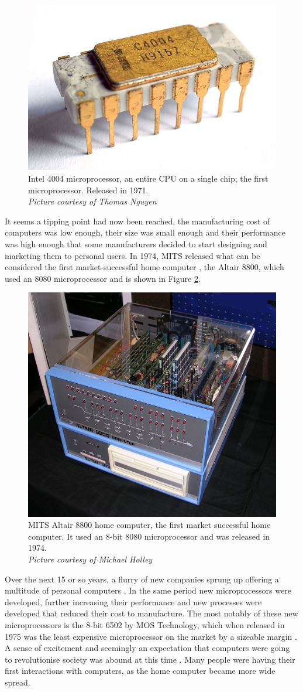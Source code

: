 \begin{figure} \begin{center}
\includegraphics[width=.3\linewidth]{pics/intel_4004} 
\end{center} 
\caption{Intel 4004 microprocessor, an entire CPU on a single chip; the first microprocessor. Released in 1971.\\ \textit{\small{Picture courtesy of Thomas Nguyen}}}
\label{Intel4004}
\end{figure} 

It seems a tipping point had now been reached, the manufacturing cost of computers was low enough, their size was small enough and their performance was high enough that some manufacturers decided to start designing and marketing them to personal users. In 1974, MITS released what can be considered the first market-successful home computer 
\cite{RN41}, the Altair 8800, which used an 8080 microprocessor and is shown in Figure \ref{Altair8800}.

\begin{figure} \begin{center}
\includegraphics[width=.3\linewidth]{pics/altair_8800_computer} 
\end{center} 
\caption{MITS Altair 8800 home computer, the first market successful home computer. It used an 8-bit 8080 microprocessor and was released in 1974.\\ \textit{\small{Picture courtesy of Michael Holley}}}
\label{Altair8800}
\end{figure}

Over the next 15 or so years, a flurry of new companies sprung up offering a multitude of personal computers 
\cite{RN27}. In the same period new microprocessors were developed, further increasing their performance and new processes were developed that reduced their cost to manufacture. The most notably of these new microprocessors is the 8-bit 6502 by MOS Technology, which when released in 1975 was the least expensive microprocessor on the market by a sizeable margin 
\cite{RN40}. A sense of excitement and seemingly an expectation that computers were going to revolutionise society was abound at this time 
\cite{RN34}. Many people were having their first interactions with computers, as the home computer became more wide spread.

